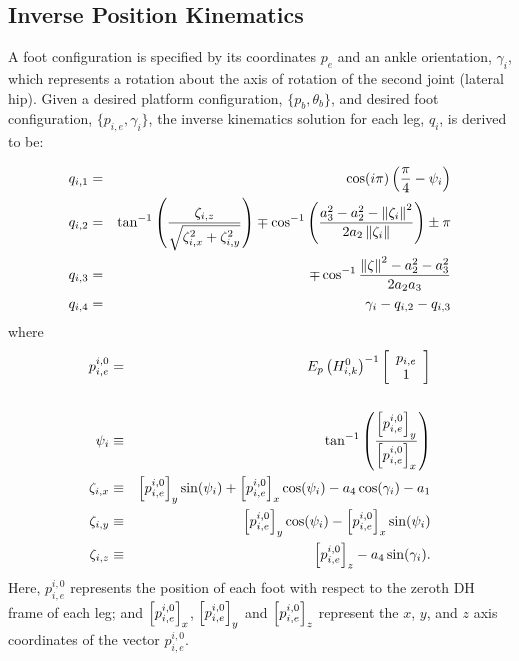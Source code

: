 		\subsection{Inverse Position Kinematics}
			\label{sec::inverse_position_kinematics}
			
			A foot configuration is specified by its coordinates ${p}_{e}$ and an ankle orientation, $\gamma_{i}$,  which represents a rotation about the axis of rotation of the second joint (lateral hip). Given a desired platform configuration, $\{ {p}_{b}, \theta_{b} \}$,  and desired \Ith foot configuration,  $\{ {p}_{i,e} , \gamma_{i} \}$, the inverse kinematics solution for each \Ith leg, ${q}_{i}$, is derived to be:

				\begin{eqnarray}
					q_{i,1} &=& \cos(i\pi) \left( \frac{\pi}{4} - \psi_{i} \right) \nonumber\\
					q_{i,2} &=&	\tan^{-1} \left(\frac{\zeta_{i,z}}{\sqrt{\zeta_{i,x}^2+\zeta_{i,y}^2}}\right) \mp \cos^{-1}\left(\frac{a_{3}^2-a_{2}^2-\left\lVert\zeta_{i}\right\rVert^2}{2 a_{2} \left\lVert\zeta_{i}\right\rVert }\right) \pm \pi 	\nonumber\\
					q_{i,3} &=&	\mp \cos^{-1}\frac{\left\lVert\zeta\right\rVert^2-a_{2}^2-a_{3}^2}{2 a_{2} a_{3}} \nonumber\\
					q_{i,4} &=&	\gamma_{i} - q_{i,2} - q_{i,3}	
				\end{eqnarray}
				where
				\begin{eqnarray}
					{p}_{i,e}^{i,0} &=&
					E_{p} 
					\left( {H}_{i,k}^{0} \right) ^{-1}
					\left[
						\begin{array}{c}
							{p}_{i,e} 		\\
							1 				\\ 	
						\end{array}
					\right]	\nonumber\\																						\nonumber\\
					\psi_{i} 	&\equiv&	\tan^{-1}\left( \frac{\left[{p}_{i,e}^{i,0}\right]_{y}}{\left[{p}_{i,e}^{i,0}\right]_{x} } \right)												\nonumber\\
					\zeta_{i,x} &\equiv& 	\left[{p}_{i,e}^{i,0}\right]_{y} \sin(\psi_{i}) + \left[{p}_{i,e}^{i,0}\right]_{x} \cos(\psi_{i}) - a_{4} \cos(\gamma_{i}) - a_{1} 						\nonumber\\
					\zeta_{i,y} &\equiv& 	\left[{p}_{i,e}^{i,0}\right]_{y} \cos(\psi_{i}) - \left[{p}_{i,e}^{i,0}\right]_{x} \sin(\psi_{i}) 											\nonumber\\
					\zeta_{i,z}	&\equiv&  	\left[{p}_{i,e}^{i,0}\right]_{z} - a_{4} \sin(\gamma_{i}) .
				\end{eqnarray}
			Here, ${p}_{i,e}^{i,0}$ represents the position of each \Ith foot with respect to the zeroth DH frame of each \Ith leg; and $\left[{p}_{i,e}^{i,0}\right]_{x}$, $\left[{p}_{i,e}^{i,0}\right]_{y}$ and $\left[{p}_{i,e}^{i,0}\right]_{z}$ represent the $x$, $y$, and $z$ axis coordinates of the vector ${p}_{i,e}^{i,0}$.

